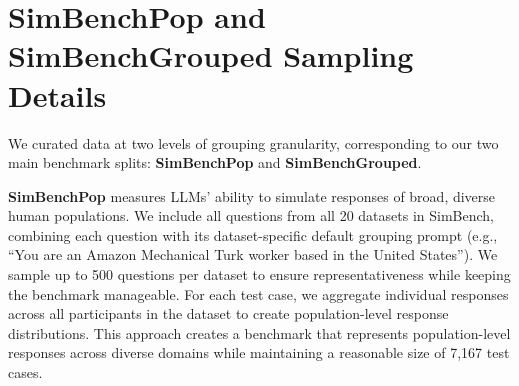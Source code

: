 \documentclass{article} %
\begin{document}
\section{SimBenchPop and SimBenchGrouped Sampling Details}
\label{sec: simbench_sampling_detail}
We curated data at two levels of grouping granularity, corresponding to our two main benchmark splits: \textbf{SimBenchPop} and \textbf{SimBenchGrouped}.

\textbf{SimBenchPop} measures LLMs' ability to simulate responses of broad, diverse human populations. We include all questions from all 20 datasets in SimBench, combining each question with its dataset-specific default grouping prompt (e.g., ``You are an Amazon Mechanical Turk worker based in the United States''). We sample up to 500 questions per dataset to ensure representativeness while keeping the benchmark manageable. For each test case, we aggregate individual responses across all participants in the dataset to create population-level response distributions. This approach creates a benchmark that represents population-level responses across diverse domains while maintaining a reasonable size of 7,167 test cases.
\end{document}
